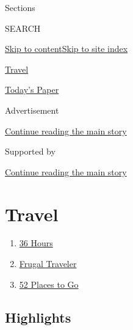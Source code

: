 Sections

SEARCH

\protect\hyperlink{site-content}{Skip to
content}\protect\hyperlink{site-index}{Skip to site index}

\href{https://www.nytimes.com/section/travel}{Travel}

\href{https://myaccount.nytimes.com/auth/login?response_type=cookie\&client_id=vi}{}

\href{https://www.nytimes.com/section/todayspaper}{Today's Paper}

Advertisement

\protect\hyperlink{after-top}{Continue reading the main story}

Supported by

\protect\hyperlink{after-sponsor}{Continue reading the main story}

\hypertarget{travel}{%
\section{Travel}\label{travel}}

\begin{enumerate}
\def\labelenumi{\arabic{enumi}.}
\tightlist
\item
  \href{/column/36-hours}{36 Hours}
\item
  \href{/column/frugal-traveler}{Frugal Traveler}
\item
  \href{/interactive/2020/travel/places-to-visit.html}{52 Places to Go}
\end{enumerate}

\hypertarget{highlights}{%
\subsection{Highlights}\label{highlights}}


